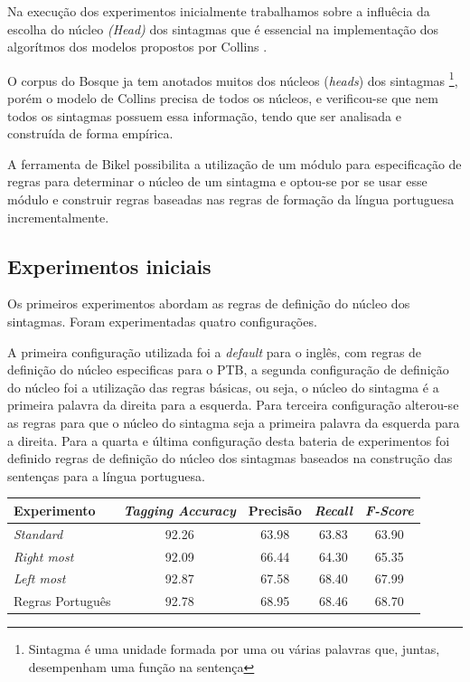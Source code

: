 Na execução dos experimentos inicialmente trabalhamos sobre a influêcia da escolha do núcleo \emph{(Head)} dos sintagmas que é essencial na implementação dos algorítmos dos modelos propostos por Collins \cite{collins99}.

O corpus do Bosque ja tem anotados muitos dos núcleos (\emph{heads}) dos sintagmas \footnote{Sintagma é uma unidade formada por uma ou várias palavras que, juntas, desempenham uma função na sentença}, porém o modelo de Collins precisa de todos os núcleos, e verificou-se que nem todos os sintagmas possuem essa informação, tendo que ser analisada e construída de forma empírica.

A ferramenta de Bikel possibilita a utilização de um módulo para especificação de regras para determinar o núcleo de um sintagma e optou-se por se usar esse módulo e construir regras baseadas nas regras de formação da língua portuguesa incrementalmente.

\subsection{Experimentos iniciais}
\label{sec:configuracoes}

Os primeiros experimentos abordam as regras de definição do núcleo dos sintagmas. Foram experimentadas quatro configurações.

A primeira configuração utilizada foi a \emph{default} para o inglês, com regras de definição do núcleo especificas para o PTB, a segunda configuração de definição do núcleo foi a utilização das regras básicas, ou seja, o núcleo do sintagma é a primeira palavra da direita para a esquerda. Para terceira configuração alterou-se as regras para que o núcleo do sintagma seja a primeira palavra da esquerda para a direita. Para a quarta e última configuração desta bateria de experimentos foi definido regras de definição do núcleo dos sintagmas baseados na construção das sentenças para a língua portuguesa.


\begin{center}
   \footnotesize
	\begin{tabular}{|l|c|c|c|c|}
		\hline
		\textbf{Experimento} &  \textbf{\emph{Tagging Accuracy}} & \textbf{Precisão} & \textbf{\emph{Recall}} & \textbf{\emph{F-Score}} \\
		\hline
		\emph{Standard} & 92.26 & 63.98 & 63.83 & 63.90\\
		\hline		
		\emph{Right most} & 92.09 & 66.44 & 64.30 & 65.35\\
		\hline		
		\emph{Left most} & 92.87 & 67.58 & 68.40 & 67.99\\
		\hline		
		Regras Português & 92.78 & 68.95 & 68.46 & 68.70\\
		\hline
	\end{tabular}
	\label{tab:primeiro_experimento}
\end{center}


